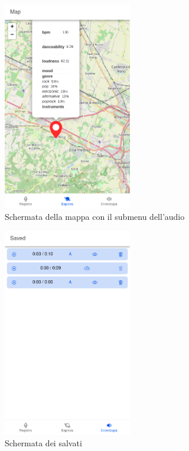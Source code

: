 \documentclass[a4paper]{article}
\begin{document}
\begin{figure}[h]
	\centering
	\includegraphics[width=0.5\textwidth]{./map-audio-submenu.png}
	\caption{Schermata della mappa con il submenu dell'audio}
\end{figure}

\begin{figure}[h]
	\centering
	\includegraphics[width=0.5\textwidth]{./saved.png}
	\caption{Schermata dei salvati}
\end{figure}
\end{document}
